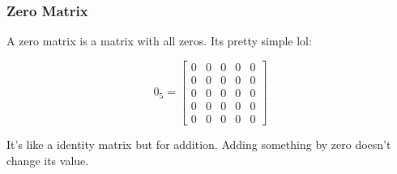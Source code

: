 \documentclass[12pt]{report}
\begin{document}
            \subsubsection{Zero Matrix}
                A zero matrix is a matrix with all zeros. Its pretty simple lol:

                \begin{equation}
                    0_5 = 
                    \begin{bmatrix}
                          0 & 0 & 0 & 0 & 0 \\
                          0 & 0 & 0 & 0 & 0 \\
                          0 & 0 & 0 & 0 & 0 \\
                          0 & 0 & 0 & 0 & 0 \\
                          0 & 0 & 0 & 0 & 0
                    \end{bmatrix}
                \end{equation}

                It's like a identity matrix but for addition. Adding something by zero doesn't change its value.
\end{document}
